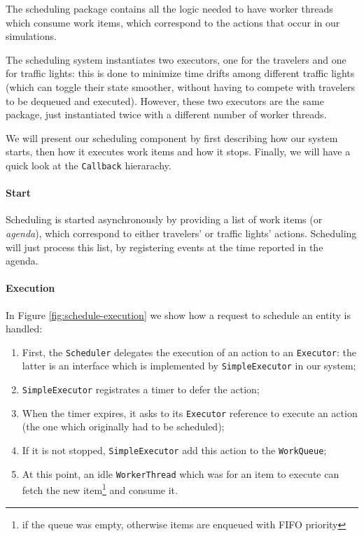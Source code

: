 The scheduling package contains all the logic needed to have worker threads
which consume work items, which correspond to the actions that occur in our
simulations.

The scheduling system instantiates two executors, one for the travelers and
one for traffic lights: this is done to minimize time drifts among different
traffic lights (which can toggle their state smoother, without having to
compete with travelers to be dequeued and executed).
However, these two executors are the same package, just instantiated twice with
a different number of worker threads.

We will present our scheduling component by first describing how our system
starts, then how it executes work items and how it stops.
Finally, we will have a quick look at the \texttt{Callback} hierarachy.

\paragraph{Start}

Scheduling is started asynchronously by providing a list of work items
(or \textit{agenda}), which correspond to either travelers' or traffic
lights' actions.
Scheduling will just process this list, by registering events at the time
reported in the agenda.

\paragraph{Execution}

In Figure \ref{fig:schedule-execution} we show how a request to schedule an
entity is handled:

\begin{enumerate}
  \item First, the \texttt{Scheduler} delegates the execution of an action to
    an \texttt{Executor}: the latter is an interface which is implemented by
    \texttt{SimpleExecutor} in our system;
  \item \texttt{SimpleExecutor} registrates a timer to defer the action;
  \item When the timer expires, it asks to its \texttt{Executor} reference to
    execute an action (the one which originally had to be scheduled);
  \item If it is not stopped, \texttt{SimpleExecutor} add this action to the
    \texttt{WorkQueue};
  \item At this point, an idle \texttt{WorkerThread} which was for an item to
    execute can fetch the new item\footnote{if the queue was empty, otherwise
    items are enqueued with FIFO priority} and consume it.
\end{enumerate}

